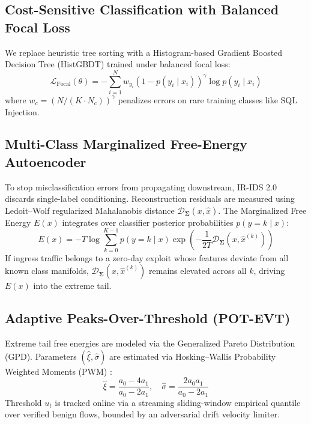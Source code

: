 \documentclass[5p,times,twocolumn]{elsarticle}
\begin{document}
\subsection{Cost-Sensitive Classification with Balanced Focal Loss}
We replace heuristic tree sorting with a Histogram-based Gradient Boosted Decision Tree (HistGBDT) trained under balanced focal loss:
\begin{equation}
\mathcal{L}_{\text{Focal}}(\theta) = - \sum_{i=1}^{N} w_{y_i} \left( 1 - p(y_i \mid x_i) \right)^\gamma \log p(y_i \mid x_i)
\end{equation}
where $w_c = (N / (K \cdot N_c))^\gamma$ penalizes errors on rare training classes like SQL Injection.

\subsection{Multi-Class Marginalized Free-Energy Autoencoder}
To stop misclassification errors from propagating downstream, IR-IDS 2.0 discards single-label conditioning. Reconstruction residuals are measured using Ledoit--Wolf regularized Mahalanobis distance $\mathcal{D}_{\mathbf{\Sigma}}(x, \hat{x})$. The Marginalized Free Energy $E(x)$ integrates over classifier posterior probabilities $p(y = k \mid x)$:
\begin{equation}
E(x) = -T \log \sum_{k=0}^{K-1} p(y = k \mid x) \exp \left( -\frac{1}{2 T} \mathcal{D}_{\mathbf{\Sigma}}\left(x, \hat{x}^{(k)}\right) \right)
\end{equation}
If ingress traffic belongs to a zero-day exploit whose features deviate from all known class manifolds, $\mathcal{D}_{\mathbf{\Sigma}}(x, \hat{x}^{(k)})$ remains elevated across all $k$, driving $E(x)$ into the extreme tail.

\subsection{Adaptive Peaks-Over-Threshold (POT-EVT)}
Extreme tail free energies are modeled via the Generalized Pareto Distribution (GPD). Parameters $(\hat{\xi}, \hat{\sigma})$ are estimated via Hosking--Wallis Probability Weighted Moments (PWM) \cite{hosking1987parameter}:
\begin{equation}
\hat{\xi} = \frac{a_0 - 4 a_1}{a_0 - 2 a_1}, \quad \hat{\sigma} = \frac{2 a_0 a_1}{a_0 - 2 a_1}
\end{equation}
Threshold $u_t$ is tracked online via a streaming sliding-window empirical quantile over verified benign flows, bounded by an adversarial drift velocity limiter.
\end{document}
